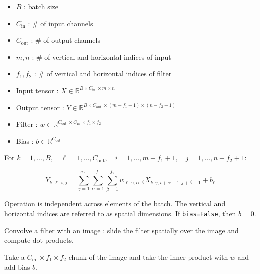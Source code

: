 \begin{definition}
    \begin{itemize}
        \item $B$ : batch size
        \item $C_{\text{in}}$ : \# of input channels
        \item $C_{\text{out}}$ : \# of output channels
        \item $m, n$ : \# of vertical and horizontal indices of input
        \item $f_1, f_2$ : \# of vertical and horizontal indices of filter
    \end{itemize}

    \par\noindent\textcolor{gray}{\hdashrule{\textwidth}{0.4pt}{1pt 2pt}}

    \begin{itemize}
        \item Input tensor : $X \in \mathbb{R}^{B \times C_{\text {in }} \times m \times n}$
        \item Output tensor : $Y \in \mathbb{R}^{B \times C_{\text {out }} \times\left(m-f_{1}+1\right) \times\left(n-f_{2}+1\right)}$
        \item Filter : $w \in \mathbb{R}^{C_{\text {out }} \times C_{\text {in }} \times f_{1} \times f_{2}}$
        \item Bias : $b \in \mathbb{R}^{C_{\text{out}}}$
    \end{itemize}

    \par\noindent\textcolor{gray}{\hdashrule{\textwidth}{0.4pt}{1pt 2pt}}

    For $k = 1, \dots, B, \quad \ell = 1, \dots, C_{\text{out}}, \quad i = 1, \dots, m-f_1+1, \quad j = 1, \dots, n-f_2+1$:

    $$
    Y_{k, \ell, i, j}=\sum_{\gamma=1}^{c_{\text {in }}} \sum_{\alpha=1}^{f_{1}} \sum_{\beta=1}^{f_{2}} w_{\ell, \gamma, \alpha, \beta} X_{k, \gamma, i+\alpha-1, j+\beta-1}+b_{\ell}
    $$

    Operation is independent across elements of the batch.
    The vertical and horizontal indices are referred to as spatial dimensions.
    If \verb|bias=False|, then $b=0$.

    \par\noindent\textcolor{gray}{\hdashrule{\textwidth}{0.4pt}{1pt 2pt}}

    Convolve a filter with an image : slide the filter spatially over the image and compute dot products.

    Take a $C_{\text {in }} \times f_{1} \times f_{2}$ chunk of the image and take the inner product with $w$ and add bias $b$.
\end{definition}


